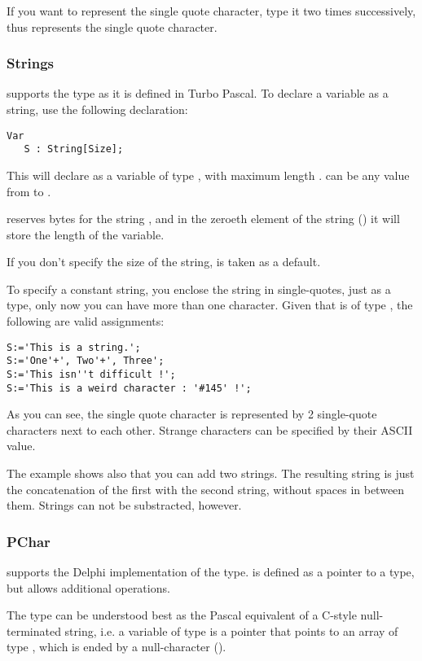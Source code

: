 \documentclass{report}
\begin{document}
If you want to represent the single quote character, type it two times
successively, thus  represents the single quote character.

\subsubsection{Strings}

\fpc supports the  type as it is defined in Turbo Pascal.
To declare a variable as a string, use the following declaration:
\begin{verbatim}
Var
   S : String[Size];
\end{verbatim}
This will declare  as a variable of type , with maximum
length .  can be any value from  to .

\fpc reserves  bytes for the string , and in the zeroeth
element of the string () it will store the length of the variable.

If you don't specify the size of the string,  is taken as a
default.

To specify a constant string, you enclose the string in single-quotes, just
as a  type, only now you can have more than one character.
Given that  is of type , the following are valid assignments: 
\begin{verbatim}
S:='This is a string.';
S:='One'+', Two'+', Three';
S:='This isn''t difficult !';
S:='This is a weird character : '#145' !';
\end{verbatim}
As you can see, the single quote character is represented by 2 single-quote
characters next to each other. Strange characters can be specified by their
ASCII value.

The example shows also that you can add two strings. The resulting string is
just the concatenation of the first with the second string, without spaces in
between them. Strings can not be substracted, however.

\subsubsection{PChar}

\fpc supports the Delphi implementation of the  type. 
is defined as a pointer to a  type, but allows additional
operations. 

The  type can be understood best as the Pascal equivalent of a
C-style null-terminated string, i.e. a variable of type  is a pointer
that points to an array of type , which is ended by a
null-character ().
\end{document}
